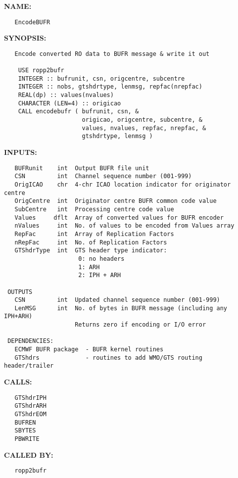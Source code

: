 \label{ch:robo98}
\label{ch:ropp2bufr_EncodeBUFR_ec}
\textbf{NAME:}\hspace{0.08in}\begin{Verbatim}
   EncodeBUFR
\end{Verbatim}
\textbf{SYNOPSIS:}\hspace{0.08in}\begin{Verbatim}
   Encode converted RO data to BUFR message & write it out

    USE ropp2bufr
    INTEGER :: bufrunit, csn, origcentre, subcentre
    INTEGER :: nobs, gtshdrtype, lenmsg, repfac(nrepfac)
    REAL(dp) :: values(nvalues)
    CHARACTER (LEN=4) :: origicao
    CALL encodebufr ( bufrunit, csn, &
                      origicao, origcentre, subcentre, &
                      values, nvalues, repfac, nrepfac, &
                      gtshdrtype, lenmsg )
\end{Verbatim}
\textbf{INPUTS:}\hspace{0.08in}\begin{Verbatim}
   BUFRunit    int  Output BUFR file unit
   CSN         int  Channel sequence number (001-999)
   OrigICAO    chr  4-chr ICAO location indicator for originator centre
   OrigCentre  int  Originator centre BUFR common code value
   SubCentre   int  Processing centre code value
   Values     dflt  Array of converted values for BUFR encoder
   nValues     int  No. of values to be encoded from Values array
   RepFac      int  Array of Replication Factors
   nRepFac     int  No. of Replication Factors
   GTShdrType  int  GTS header type indicator:
                     0: no headers
                     1: ARH
                     2: IPH + ARH

 OUTPUTS
   CSN         int  Updated channel sequence number (001-999)
   LenMSG      int  No. of bytes in BUFR message (including any IPH+ARH)
                    Returns zero if encoding or I/O error

 DEPENDENCIES:
   ECMWF BUFR package  - BUFR kernel routines
   GTShdrs             - routines to add WMO/GTS routing header/trailer
\end{Verbatim}
\textbf{CALLS:}\hspace{0.08in}\begin{Verbatim}
   GTShdrIPH
   GTShdrARH
   GTShdrEOM
   BUFREN
   SBYTES
   PBWRITE
\end{Verbatim}
\textbf{CALLED BY:}\hspace{0.08in}\begin{Verbatim}
   ropp2bufr
\end{Verbatim}
